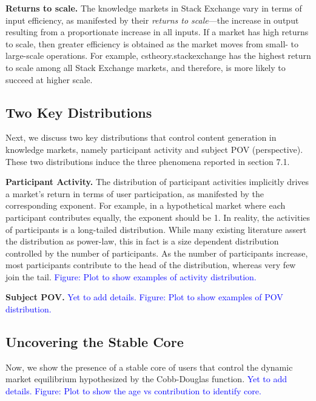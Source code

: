 \textbf{Returns to scale.} The knowledge markets in Stack Exchange vary in terms of input efficiency, as manifested by their \emph{returns to scale}---the increase in output resulting from a proportionate increase in all inputs. If a market has high returns to scale, then greater efficiency is obtained as the market moves from small- to large-scale operations. For example, cstheory.stackexchange has the highest return to scale among all Stack Exchange markets, and therefore, is more likely to succeed at higher scale.

\subsection{Two Key Distributions} 
Next, we discuss two key distributions that control content generation in knowledge markets, namely participant activity and subject POV (perspective). These two distributions induce the three phenomena reported in section 7.1. 

\textbf{Participant Activity.} The distribution of participant activities implicitly drives a market's return in terms of user participation, as manifested  by the corresponding exponent. For example, in a hypothetical market where each participant contributes equally, the exponent should be 1. In reality, the activities of participants is a long-tailed distribution. While many existing literature assert the distribution as power-law, this in fact is a size dependent distribution controlled by the number of participants. As the number of participants increase, most participants contribute to the head of the distribution, whereas very few join the tail. \textcolor{blue}{Figure: Plot to show examples of activity distribution.}

\textbf{Subject POV.} \textcolor{blue}{Yet to add details. Figure: Plot to show examples of POV distribution.}

\subsection{Uncovering the Stable Core} 
Now, we show the presence of a stable core of users that control the dynamic market equilibrium hypothesized by the Cobb-Douglas function. \textcolor{blue}{Yet to add details. Figure: Plot to show the age vs contribution to identify core.}


